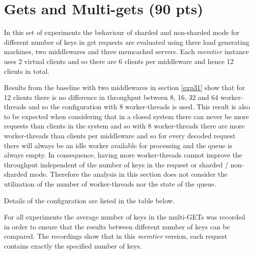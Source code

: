 \documentclass[report.tex]{subfiles}
\begin{document}
\section{Gets and Multi-gets (90 pts)}\label{exp5}


In this set of experiments the behaviour of sharded and non-sharded mode for different number of keys in get requests are evaluated using three load generating machines, two middlewares and three memcached servers.
Each \emph{memtier} instance uses 2 virtual clients and so there are 6 clients per middleware and hence 12 clients in total. 

Results from the baseline with two middlewares in section \ref{exp31} show that for 12 clients there is no difference in throughput between 8, 16, 32 and 64 worker-threads and so the configuration with 8 worker-threads is used. This result is also to be expected when considering that in a closed system there can never be more requests than clients in the system and so with 8 worker-threads there are more worker-threads than clients per middleware and so for every decoded request there will always be an idle worker available for processing and the queue is always empty. In consequence, having more worker-threads cannot improve the throughput independent of the number of keys in the request or sharded / non-sharded mode. Therefore the analysis in this section does not consider the utilization of the number of worker-threads nor the state of the queue.

Details of the configuration are listed in the table below.

For all experiments the average number of keys in the multi-GETs was recorded in order to ensure that the results between different number of keys can be compared. The recordings show that in this \emph{memtier} version, each request contains exactly the specified number of keys.
\end{document}

